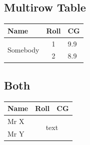 \documentclass[letter, 12pt]{article}
\begin{document}
\subsection{Multirow  Table}
\begin{tabular}{|l|cl|}
	\hline
	Name & Roll & CG   \\
	\hline
	\multirow{2}{*}{Somebody} & 1   &  9.9 \\ 
	\cline{2-3}
	 & 2   &  8.9 \\ 
	 \hline

\end{tabular}

\subsection{Both}
\begin{tabular}{|l|cl|}
	\hline
	Name & Roll & CG   \\
	\hline
	Mr X & \multicolumn{2}{|c|}{\multirow{2}{*}{text}} \\
	Mr Y & & \\ 
	\hline
	
\end{tabular}
\end{document}
